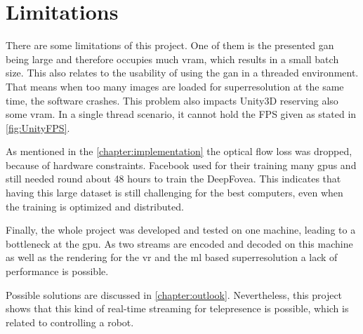 \section{Limitations}
There are some limitations of this project. One of them is the presented \gls{gan} being large and therefore occupies much \gls{vram}, which results in a small batch size. This also relates to the usability of using the \gls{gan} in a threaded environment. That means when too many images are loaded for superresolution at the same time, the software crashes. This problem also impacts Unity3D reserving also some \gls{vram}. In a single thread scenario, it cannot hold the FPS given as stated in \autoref{fig:UnityFPS}.
\par
As mentioned in the \autoref{chapter:implementation} the optical flow loss was dropped, because of hardware constraints. Facebook used for their training many \glspl{gpu} and still needed round about 48 hours to train the DeepFovea. This indicates that having this large dataset is still challenging for the best computers, even when the training is optimized and distributed.
\par
Finally, the whole project was developed and tested on one machine, leading to a bottleneck at the \gls{gpu}. As two streams are encoded and decoded on this machine as well as the rendering for the \gls{vr} and the \gls{ml} based superresolution a lack of performance is possible. 
\par
Possible solutions are discussed in \autoref{chapter:outlook}. Nevertheless, this project shows that this kind of real-time streaming for telepresence is possible, which is related to controlling a robot.